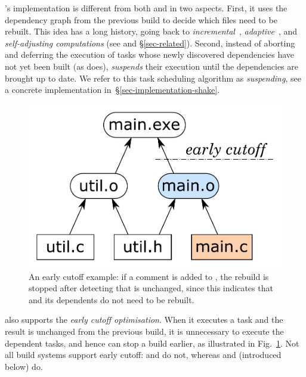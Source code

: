 \Shake's implementation is different from both \Make and \Excel in two aspects.
First, it uses the dependency graph from the previous build to decide which
files need to be rebuilt. This idea has a long history, going back to
\emph{incremental}~\cite{demers1981incremental},
\emph{adaptive}~\cite{acar2002adaptive}, and
\emph{self-adjusting computations} (see \cite{acar2007selfadjusting} and
\S\ref{sec-related}). Second, instead of aborting and deferring the execution of
tasks whose newly discovered dependencies have not yet been built (as \Excel
does), \Shake \emph{suspends} their execution until the dependencies are brought
up to date. We refer to this task scheduling algorithm as \emph{suspending},
see a concrete implementation in~\S\ref{sec-implementation-shake}.

\begin{figure}
\vspace{-3mm}
\centerline{\includegraphics[scale=0.28]{fig/shake-example-cutoff.pdf}}
\vspace{-4mm}
\caption{An early cutoff example: if a comment is added to , the
rebuild is stopped after detecting that  is unchanged, since this
indicates that  and its dependents do not need to be
rebuilt.\label{fig-cutoff}}
\vspace{-4mm}
\end{figure}

\Shake also supports the \emph{early cutoff optimisation}. When it
executes a task and the result is unchanged from the previous build, it is
unnecessary to execute the dependent tasks, and hence \Shake can stop a build
earlier, as illustrated in Fig.~\ref{fig-cutoff}. Not all build systems support
early cutoff: \Make and \Excel do not, whereas \Shake and \Bazel (introduced
below) do.

